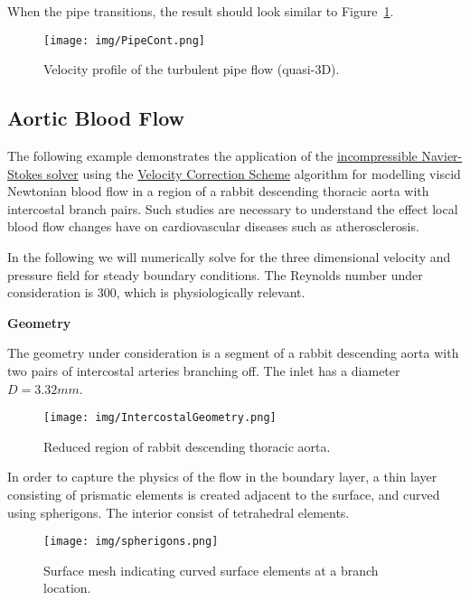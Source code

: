 When the pipe transitions, the result should look similar to
Figure~\ref{f:incns:turbpipeflow}.

\begin{figure}
\begin{center}
\texttt{[image: img/PipeCont.png]}
\caption{Velocity profile of the turbulent pipe flow (quasi-3D).}
\label{f:incns:turbpipeflow}
\end{center}
\end{figure}



\subsection{Aortic Blood Flow}
The following example demonstrates the application of the
\hyperref[IncNSsolver]{incompressible Navier-Stokes solver} using the
\hyperref[VCSscheme]{Velocity Correction Scheme} algorithm for modelling viscid
Newtonian blood flow in a region of a rabbit descending thoracic aorta with
intercostal branch pairs. Such studies are necessary to understand the effect
local blood flow changes have on cardiovascular diseases such as
atherosclerosis.

In the following we will numerically solve for the three dimensional velocity
and pressure field for steady boundary conditions. The Reynolds number under
consideration is 300, which is physiologically relevant.

\textbf{Geometry}

The geometry under consideration is a segment of a rabbit descending aorta with two pairs of intercostal arteries branching off. The inlet has a diameter $D=3.32mm$.

\begin{figure}
\begin{center}
\texttt{[image: img/IntercostalGeometry.png]}
\caption{Reduced region of rabbit descending thoracic aorta.}
\end{center}
\end{figure}

In order to capture the physics of the flow in the boundary layer, a thin layer consisting of prismatic elements is created adjacent to the surface, and curved using spherigons. The interior consist of tetrahedral elements.

\begin{figure}
\begin{center}
\texttt{[image: img/spherigons.png]}
\caption{Surface mesh indicating curved surface elements at a branch location.}
\end{center}
\end{figure}


